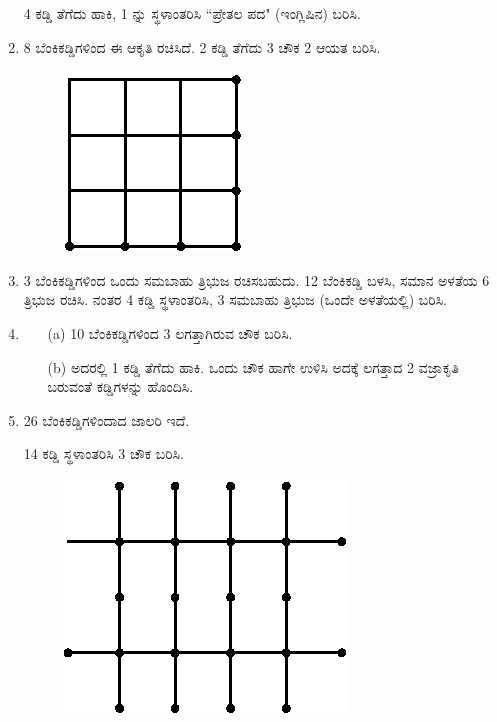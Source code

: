 \begin{enumerate}
4 ಕಡ್ಡಿ ತೆಗೆದು ಹಾಕಿ, 1 ನ್ನು ಸ್ಥಳಾಂತರಿಸಿ ``ಪ್ರೇತಲ ಪದ" (ಇಂಗ್ಲಿಷಿನ) ಬರಿಸಿ.  

\item 8 ಬೆಂಕಿಕಡ್ಡಿಗಳಿಂದ ಈ ಆಕೃತಿ ರಚಿಸಿದೆ. 2 ಕಡ್ಡಿ ತೆಗೆದು 3 ಚೌಕ 2 ಆಯತ ಬರಿಸಿ.

\begin{figure}[H]
\centering
\includegraphics{images/chap5/q9.eps}
\end{figure}

\item  3 ಬೆಂಕಿಕಡ್ಡಿಗಳಿಂದ ಒಂದು ಸಮಬಾಹು ತ್ರಿಭುಜ ರಚಿಸಬಹುದು. 12 ಬೆಂಕಿಕಡ್ಡಿ  ಬಳಸಿ, ಸಮಾನ ಅಳತೆಯ 6 ತ್ರಿಭುಜ ರಚಿಸಿ. ನಂತರ 4 ಕಡ್ಡಿ ಸ್ಥಳಾಂತರಿಸಿ, 3 ಸಮಬಾಹು ತ್ರಿಭುಜ (ಒಂದೇ ಅಳತೆಯಲ್ಲಿ) ಬರಿಸಿ.

\item 
\begin{itemize}
\item[(a)] 10 ಬೆಂಕಿಕಡ್ಡಿಗಳಿಂದ 3 ಲಗತ್ತಾಗಿರುವ ಚೌಕ ಬರಿಸಿ.
\item[(b)] ಅದರಲ್ಲಿ 1 ಕಡ್ಡಿ ತೆಗೆದು ಹಾಕಿ. ಒಂದು ಚೌಕ ಹಾಗೇ ಉಳಿಸಿ ಅದಕ್ಕೆ ಲಗತ್ತಾದ 2 ವಜ್ರಾಕೃತಿ ಬರುವಂತೆ ಕಡ್ಡಿಗಳನ್ನು ಹೊಂದಿಸಿ.  
\end{itemize}

\item 26 ಬೆಂಕಿಕಡ್ಡಿಗಳಿಂದಾದ ಜಾಲರಿ ಇದೆ. 

14 ಕಡ್ಡಿ ಸ್ಥಳಾಂತರಿಸಿ 3 ಚೌಕ ಬರಿಸಿ. 

\begin{figure}[H]
\centering
\includegraphics[scale=1.1]{images/chap5/q12.eps}
\end{figure}


\end{enumerate}
